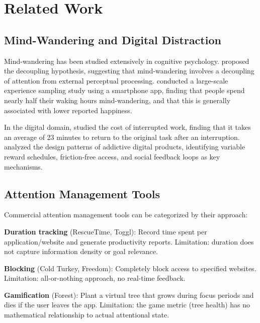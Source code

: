 \documentclass[10pt,letterpaper]{article}
\begin{document}
\section{Related Work}
\label{sec:related}

\subsection{Mind-Wandering and Digital Distraction}

Mind-wandering has been studied extensively in cognitive psychology. \cite{smallwood2006restless} proposed the decoupling hypothesis, suggesting that mind-wandering involves a decoupling of attention from external perceptual processing. \cite{killingsworth2010wandering} conducted a large-scale experience sampling study using a smartphone app, finding that people spend nearly half their waking hours mind-wandering, and that this is generally associated with lower reported happiness.

In the digital domain, \cite{mark2008cost} studied the cost of interrupted work, finding that it takes an average of 23 minutes to return to the original task after an interruption. \cite{alter2017irresistible} analyzed the design patterns of addictive digital products, identifying variable reward schedules, friction-free access, and social feedback loops as key mechanisms.

\subsection{Attention Management Tools}

Commercial attention management tools can be categorized by their approach:

\textbf{Duration tracking} (RescueTime, Toggl): Record time spent per application/website and generate productivity reports. Limitation: duration does not capture information density or goal relevance.

\textbf{Blocking} (Cold Turkey, Freedom): Completely block access to specified websites. Limitation: all-or-nothing approach, no real-time feedback.

\textbf{Gamification} (Forest): Plant a virtual tree that grows during focus periods and dies if the user leaves the app. Limitation: the game metric (tree health) has no mathematical relationship to actual attentional state.
\end{document}
